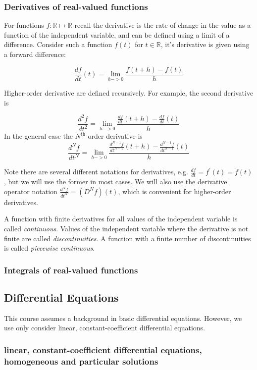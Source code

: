 \subsubsection*{Derivatives of real-valued functions}

For functions $f:\mathbb{R}\mapsto\mathbb{R}$ recall the derivative is the rate of change in the value as a function of the independent variable, and can be defined using a limit of a difference. Consider such a function $f(t)$ for $t\in\mathbb{R}$, it's derivative is given using a forward difference:

\[
\frac{df}{dt} (t) = \lim_{h->0} \frac{f(t+h)-f(t)}{h}
\]

Higher-order derivative are defined recursively. For example, the second derivative is

\[
\frac{d^2f}{dt^2} = \lim_{h->0} \frac{\frac{df}{dt}(t+h)-\frac{df}{dt}(t)}{h}
\]
In the general case the $N^\text{th}$ order derivative is
\[
\frac{d^Nf}{dt^N} = \lim_{h->0} \frac{\frac{d^{N-1}f}{dt^{N-1}}(t+h)-\frac{d^{N-1}f}{dt^{N-1}}(t)}{h}
\]

Note there are several different notations for derivatives, e.g. $\frac{df}{dt} = f^\prime (t) = \dot{f}(t)$, but we will use the former in most cases. We will also use the derivative operator notation $\frac{d^Nf}{dt^N} = (D^N f)(t)$, which is convenient for higher-order derivatives.

A function with finite derivatives for all values of the independent variable is called \textit{continuous}. Values of the independent variable where the derivative is not finite are called \textit{discontinuities}. A function with a finite number of discontinuities is called \textit{piecewise continuous}.

\subsubsection*{Integrals of real-valued functions}

\subsection{Differential Equations}

This course assumes a background in basic differential equations. However, we use only consider linear, constant-coefficient differential equations.

\subsubsection*{linear, constant-coefficient differential equations, homogeneous and particular solutions}

